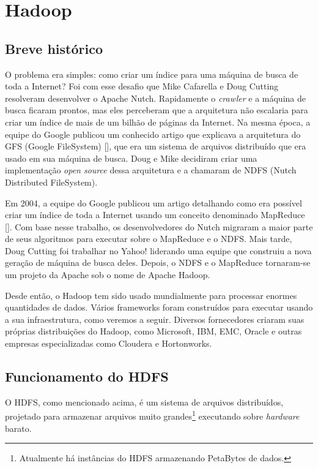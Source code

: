 \section{Hadoop}
\subsection{Breve histórico}
O problema era simples: como criar um índice para uma máquina de busca de toda a Internet? Foi com esse desafio que Mike Cafarella e Doug Cutting resolveram desenvolver o Apache Nutch. Rapidamente o \textit{crawler} e a máquina de busca ficaram prontos, mas eles perceberam que a arquitetura não escalaria para criar um índice de mais de um bilhão de páginas da Internet. Na mesma época, a equipe do Google publicou um conhecido artigo que explicava a arquitetura do GFS (Google FileSystem) [], que era um sistema de arquivos distribuído que era usado em sua máquina de busca. Doug e Mike decidiram criar uma implementação \textit{open source} dessa arquitetura e a chamaram de NDFS (Nutch Distributed FileSystem).

Em 2004, a equipe do Google publicou um artigo detalhando como era possível criar um índice de toda a Internet usando um conceito denominado MapReduce []. Com base nesse trabalho, os desenvolvedores do Nutch migraram a maior parte de seus algoritmos para executar sobre o MapReduce e o NDFS. Mais tarde, Doug Cutting foi trabalhar no Yahoo! liderando uma equipe que construiu a nova geração de máquina de busca deles. Depois, o NDFS e o MapReduce tornaram-se um projeto da Apache sob o nome de Apache Hadoop.

Desde então, o Hadoop tem sido usado mundialmente para processar enormes quantidades de dados. Vários frameworks foram construídos para executar usando a sua infraestrutura, como veremos a seguir. Diversos fornecedores criaram suas próprias distribuições do Hadoop, como Microsoft, IBM, EMC, Oracle e outras empresas especializadas como Cloudera e Hortonworks.

\subsection{Funcionamento do HDFS}
O HDFS, como mencionado acima, é um sistema de arquivos distribuídos, projetado para armazenar arquivos muito grandes\footnote{Atualmente há instâncias do HDFS armazenando PetaBytes de dados.} executando sobre \textit{hardware} barato. 

